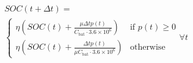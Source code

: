 \begin{equation}
\begin{split}
	&SOC(t+\Delta t) =\\
	&\begin{cases}
		\eta \left(SOC(t) + \frac{\mu \Delta t p(t)}{C_\text{bat}\cdot3.6\times10^6}\right) &\text{if } p(t) \geq 0\\
		\eta \left(SOC(t) + \frac{\Delta t p(t)}{\mu C_\text{bat}\cdot3.6\times10^6}\right) &\text{otherwise}
	\end{cases}
	\forall t
\end{split}
	\label{ch2:equ:battery-model-equation}
\end{equation}